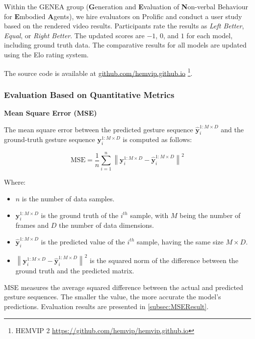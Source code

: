 Within the GENEA group (\textbf{G}eneration and \textbf{E}valuation of \textbf{N}on-verbal Behaviour for \textbf{E}mbodied \textbf{A}gents), we hire evaluators on Prolific and conduct a user study based on the rendered video results. Participants rate the results as \textit{Left Better}, \textit{Equal}, or \textit{Right Better}. The updated scores are $-1$, $0$, and $1$ for each model, including ground truth data. The comparative results for all models are updated using the Elo rating system.

The source code is available at \hyperlink{https://github.com/hemvip/hemvip.github.io/}{github.com/hemvip.github.io}
\footnote{HEMVIP 2 \url{https://github.com/hemvip/hemvip.github.io}}.

\subsubsection{Evaluation Based on Quantitative Metrics}

\textbf{Mean Square Error (MSE)}

The mean square error between the predicted gesture sequence $\hat{\mathbf{y}}_i^{1:M \times D}$ and the ground-truth gesture sequence $\mathbf{y}_i^{1:M \times D}$ is computed as follows:

\begin{equation}
	\text{MSE} = \frac{1}{n} \sum_{i=1}^n \left\| \mathbf{y}_i^{1:M \times D} - \hat{\mathbf{y}}_i^{1:M \times D} \right\|^2
\end{equation}

Where:
\begin{itemize}
	\item $n$ is the number of data samples.
	\item $\mathbf{y}_i^{1:M \times D}$ is the ground truth of the $i^{th}$ sample, with $M$ being the number of frames and $D$ the number of data dimensions.
	\item $\hat{\mathbf{y}}_i^{1:M \times D}$ is the predicted value of the $i^{th}$ sample, having the same size $M \times D$.
	\item $\left\| \mathbf{y}_i^{1:M \times D} - \hat{\mathbf{y}}_i^{1:M \times D} \right\|^2$ is the squared norm of the difference between the ground truth and the predicted matrix.
\end{itemize}

MSE measures the average squared difference between the actual and predicted gesture sequences. The smaller the value, the more accurate the model's predictions. Evaluation results are presented in \autoref{subsec:MSEResult}.

